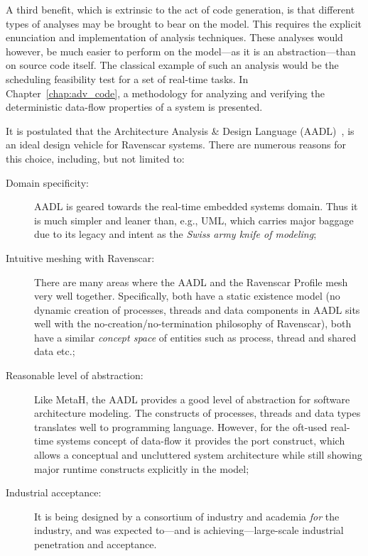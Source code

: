 A third benefit, which is extrinsic to the act of code generation, is
that different types of analyses may be brought to bear on the
model. This requires the explicit enunciation and implementation of
analysis techniques. These analyses would however, be much easier to
perform on the model---as it is an abstraction---than on source code
itself. The classical example of such an analysis would be the
scheduling feasibility test for a set of real-time tasks. In
Chapter~\ref{chap:adv_code}, a methodology for analyzing and verifying
the deterministic data-flow properties of a system is presented.

It is postulated that the Architecture Analysis \& Design Language
(AADL)~\cite{AS5506}, is an ideal design vehicle for Ravenscar
systems. There are numerous reasons for this choice, including, but
not limited to:

\begin{description}
\item[Domain specificity:]{AADL is geared towards the real-time
  embedded systems domain. Thus it is much simpler and leaner than,
  e.g., UML, which carries major baggage due to its legacy and intent
  as the \emph{Swiss army knife of modeling};}
\item[Intuitive meshing with Ravenscar:]{There are many areas where
  the AADL and the Ravenscar Profile mesh very well
  together. Specifically, both have a static existence model (no
  dynamic creation of processes, threads and data components in AADL
  sits well with the no-creation/no-termination philosophy of
  Ravenscar), both have a similar \emph{concept space} of entities
  such as process, thread and shared data etc.;}
\item[Reasonable level of abstraction:]{Like MetaH, the AADL provides
  a good level of abstraction for software architecture
  modeling. The constructs of processes, threads and data types
  translates well to programming language. However, for the oft-used
  real-time systems concept of data-flow it provides the port
  construct, which allows a conceptual and uncluttered system
  architecture while still showing major runtime constructs explicitly
  in the model;}
\item[Industrial acceptance:]{It is being designed by a consortium of
  industry and academia \emph{for} the industry, and was expected
  to---and is achieving---large-scale industrial penetration and
  acceptance.}
\end{description}


